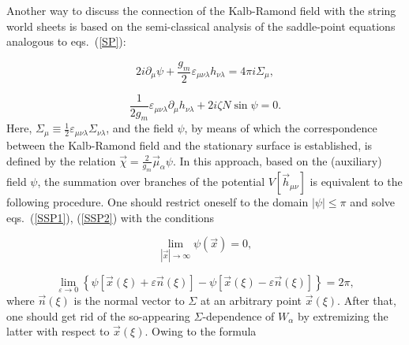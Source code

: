 \documentclass[a4paper,12pt]{article}
\begin{document}
Another way to discuss the connection of the Kalb-Ramond field with the string world sheets is based on the
semi-classical analysis of the saddle-point equations analogous to eqs.~(\ref{SP}):

\begin{equation}
\label{SSP1}
2i\partial_\mu\psi+\frac{g_m}{2}\varepsilon_{\mu\nu\lambda}h_{\nu\lambda}=4\pi i\Sigma_\mu,
\end{equation}

\begin{equation}
\label{SSP2}
\frac{1}{2g_m}\varepsilon_{\mu\nu\lambda}\partial_\mu h_{\nu\lambda}+2i\zeta N\sin\psi=0.
\end{equation}
Here, $\Sigma_\mu\equiv\frac12\varepsilon_{\mu\nu\lambda}\Sigma_{\nu\lambda}$,
and the field $\psi$, by means of which the correspondence between the Kalb-Ramond field and the stationary surface is established,
is defined by the relation $\vec\chi=\frac{2}{g_m}\vec\mu_\alpha\psi$. In this approach, based on the (auxiliary) field $\psi$,
the summation over branches of the potential $V\left[\vec h_{\mu\nu}\right]$ is equivalent to the following procedure.
One should restrict oneself to the domain $|\psi|\le\pi$ and solve eqs.~(\ref{SSP1}), (\ref{SSP2}) with the conditions

\begin{equation}
\label{cond1}
\lim\limits_{|\vec x|\to\infty}^{}\psi(\vec x)=0,
\end{equation}

\begin{equation}
\label{cond2}
\lim\limits_{\varepsilon\to 0}^{}\left\{\psi\left[\vec x(\xi)+\varepsilon\vec n(\xi)\right]-
\psi\left[\vec x(\xi)-\varepsilon\vec n(\xi)\right]\right\}=2\pi,
\end{equation}
where $\vec n(\xi)$ is the normal vector to $\Sigma$ at an arbitrary point $\vec x(\xi)$. After that, one should
get rid of the so-appearing $\Sigma$-dependence of $W_\alpha$ by extremizing the latter with respect to $\vec x(\xi)$.
Owing to the formula
\end{document}
